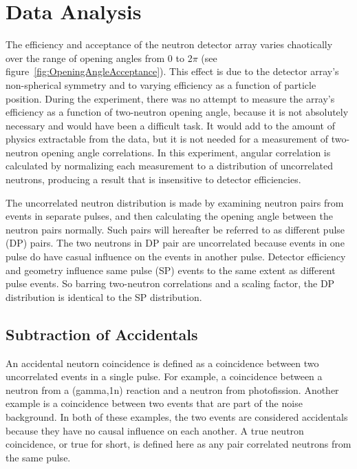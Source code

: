 \section{Data Analysis}
The efficiency and acceptance of the neutron detector array varies chaotically over the range of opening angles from 0 to 2$\pi$ (see figure~\ref{fig:OpeningAngleAcceptance}). This effect is due to the detector array's non-spherical symmetry and to varying efficiency as a function of particle position. During the experiment, there was no attempt to measure the array's efficiency as a function of two-neutron opening angle, because it is not absolutely necessary and would have been a difficult task. It would add to the amount of physics extractable from the data, but it is not needed for a measurement of two-neutron opening angle correlations. In this experiment, angular correlation is calculated by normalizing each measurement to a  distribution of uncorrelated neutrons, producing a result that is insensitive to detector efficiencies. 

The uncorrelated neutron distribution is made by examining neutron pairs from events in separate pulses, and then calculating the opening angle between the neutron pairs normally. Such pairs will hereafter be referred to as different pulse (DP) pairs. The two neutrons in DP pair are uncorrelated because events in one pulse do  have casual influence on the events in another pulse. Detector efficiency and geometry influence same pulse (SP) events to the same extent as different pulse events. So barring two-neutron correlations and a scaling factor, the DP distribution is identical to the SP distribution.

\subsection{Subtraction of Accidentals}
\label{Subtraction of Accidentals}
An accidental neutorn coincidence is defined as a coincidence between two uncorrelated events in a single pulse. For example, a coincidence between a neutron from a (gamma,1n) reaction and a neutron from photofission. Another example is a coincidence between two events that are part of the noise background. In both of these examples, the two events are considered accidentals because they have no causal influence on each another. A true neutron coincidence, or true for short, is defined here as any pair correlated neutrons from the same pulse. 

